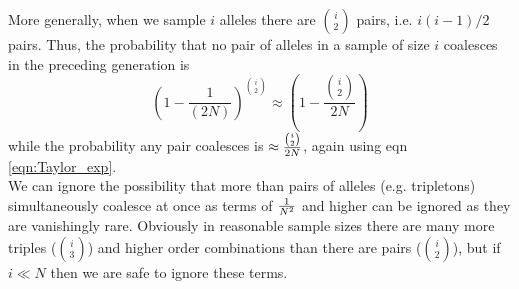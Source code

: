 More generally, when we sample $i$ alleles there are ${i \choose 2}$
pairs,  i.e. $i(i-1)/2$ pairs.
Thus, the probability that no pair of alleles in a sample of size $i$ coalesces in the preceding generation is
\begin{equation}
\left(1-\frac{1}{(2N)} \right)^{{i \choose
 2}} \approx \left( 1- \frac{{i \choose
 2}}{2N}\right)
\end{equation}
while the probability any pair coalesces is $\approx \nicefrac{{i \choose
 2}}{2N}$, again using eqn \eqref{eqn:Taylor_exp}.\\

We can ignore the possibility that more than pairs of alleles (e.g. tripletons)
simultaneously coalesce at once as terms of $\nicefrac{1}{N^2}$ and higher
can be ignored as they are vanishingly rare. Obviously in reasonable
sample sizes there are many more triples (${i \choose 3}$) and higher order
combinations than there are pairs (${i \choose 2}$), but if $i \ll N$ then we are safe to
ignore these terms.



